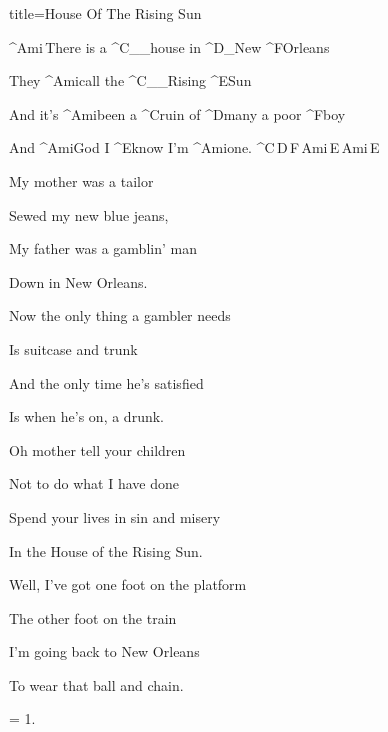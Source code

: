 \begin{song}{title=\predtitle\centering House Of The Rising Sun \\\large \vspace*{-0.3cm}}  %
\begin{centerjustified}
\nejvetsi

\sloka 
	^{Ami\,}There is a ^{C{\color{white}\_\_}}house in ^{D{\color{white}\_}}New ^{F}Orleans

	They ^{Ami}call the ^{C{\color{white}\_\_}}Rising ^{E}Sun

	And it's ^{Ami}been a ^{C}ruin of ^{D}many a poor ^{F}boy

	And ^{Ami}God I ^{E}know I'm ^{Ami}one. ^{C\,D\,F\,Ami\,E\,Ami\,E}

\sloka
	My mother was a tailor
	
	Sewed my new blue jeans,
	
	My father was a gamblin' man
   	
   	Down in New Orleans.

\sloka
	Now the only thing a gambler needs

	Is suitcase and trunk

	And the only time he's satisfied

	Is when he's on, a drunk.

\sloka
	Oh mother tell your children

	Not to do what I have done

	Spend your lives in sin and misery

	In the House of the Rising Sun.

\sloka
	Well, I've got one foot on the platform

	The other foot on the train

	I'm going back to New Orleans

	To wear that ball and chain.

\sloka = 1.


\end{centerjustified}

\centering
{}

\setcounter{Slokočet}{0}
\end{song}
